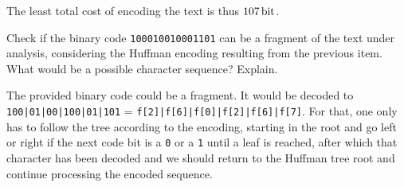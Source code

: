 {The least total cost of encoding the text is thus $\SI{107}{\bit}$.

Check if the binary code \texttt{100010010001101} can be a fragment of the text under analysis, considering the Huffman encoding resulting from the previous item. What would be a possible character sequence? Explain.

\ansseparator

The provided binary code could be a fragment. It would be decoded to \texttt{100|01|00|100|01|101} = \texttt{f[2]|f[6]|f[0]|f[2]|f[6]|f[7]}. For that, one only has to follow the tree according to the encoding, starting in the root and go left or right if the next code bit is a \texttt{0} or a \texttt{1} until a leaf is reached, after which that character has been decoded and we should return to the Huffman tree root and continue processing the encoded sequence.

}
